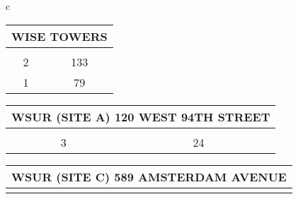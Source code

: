 \begin{table}[H]
        \small
        \begin{tabular}{c}
                            
                        \begin{tabular}{cc}
                        \multicolumn{2}{l}{WISE TOWERS}                                                                                                                                   \\ \hline
                        \rowcolor{\ccorange} 
                        \multicolumn{1}{|c|}{\cellcolor{\ccorange}{\color[HTML]{FFFFFF} Building}} & \multicolumn{1}{c|}{\cellcolor{\ccorange}{\color[HTML]{FFFFFF} Total Repairs}} \\ \hline
                        \multicolumn{1}{|c|}{2}                                                        & \multicolumn{1}{c|}{133}                                                             \\ \hline
\multicolumn{1}{|c|}{1}                                                        & \multicolumn{1}{c|}{79}                                                             \\ \hline
\end{tabular}
                        \begin{tabular}{cc}
                        \multicolumn{2}{l}{WSUR (SITE A) 120 WEST 94TH STREET}                                                                                                                                   \\ \hline
                        \rowcolor{\ccorange} 
                        \multicolumn{1}{|c|}{\cellcolor{\ccorange}{\color[HTML]{FFFFFF} Building}} & \multicolumn{1}{c|}{\cellcolor{\ccorange}{\color[HTML]{FFFFFF} Total Repairs}} \\ \hline
                        \multicolumn{1}{|c|}{3}                                                        & \multicolumn{1}{c|}{24}                                                             \\ \hline
\end{tabular}
                        \begin{tabular}{cc}
                        \multicolumn{2}{l}{WSUR (SITE C) 589 AMSTERDAM AVENUE}                                                                                                                                   \\ \hline
                        \rowcolor{\ccorange} 

\end{tabular}
\end{tabular}
\end{table}
